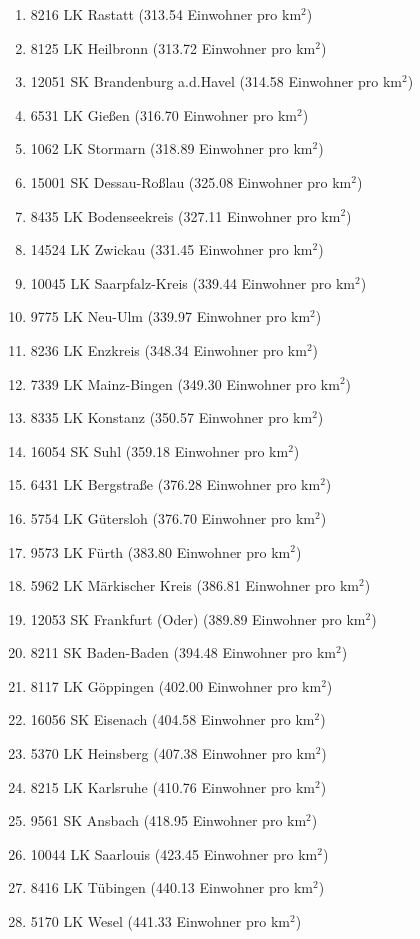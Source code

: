 \begin{enumerate}[itemsep=-6mm]
\item 8216 LK Rastatt (313.54 Einwohner pro km$^2$)
\item 8125 LK Heilbronn (313.72 Einwohner pro km$^2$)
\item 12051 SK Brandenburg a.d.Havel (314.58 Einwohner pro km$^2$)
\item 6531 LK Gießen (316.70 Einwohner pro km$^2$)
\item 1062 LK Stormarn (318.89 Einwohner pro km$^2$)
\item 15001 SK Dessau-Roßlau (325.08 Einwohner pro km$^2$)
\item 8435 LK Bodenseekreis (327.11 Einwohner pro km$^2$)
\item 14524 LK Zwickau (331.45 Einwohner pro km$^2$)
\item 10045 LK Saarpfalz-Kreis (339.44 Einwohner pro km$^2$)
\item 9775 LK Neu-Ulm (339.97 Einwohner pro km$^2$)
\item 8236 LK Enzkreis (348.34 Einwohner pro km$^2$)
\item 7339 LK Mainz-Bingen (349.30 Einwohner pro km$^2$)
\item 8335 LK Konstanz (350.57 Einwohner pro km$^2$)
\item 16054 SK Suhl (359.18 Einwohner pro km$^2$)
\item 6431 LK Bergstraße (376.28 Einwohner pro km$^2$)
\item 5754 LK Gütersloh (376.70 Einwohner pro km$^2$)
\item 9573 LK Fürth (383.80 Einwohner pro km$^2$)
\item 5962 LK Märkischer Kreis (386.81 Einwohner pro km$^2$)
\item 12053 SK Frankfurt (Oder) (389.89 Einwohner pro km$^2$)
\item 8211 SK Baden-Baden (394.48 Einwohner pro km$^2$)
\item 8117 LK Göppingen (402.00 Einwohner pro km$^2$)
\item 16056 SK Eisenach (404.58 Einwohner pro km$^2$)
\item 5370 LK Heinsberg (407.38 Einwohner pro km$^2$)
\item 8215 LK Karlsruhe (410.76 Einwohner pro km$^2$)
\item 9561 SK Ansbach (418.95 Einwohner pro km$^2$)
\item 10044 LK Saarlouis (423.45 Einwohner pro km$^2$)
\item 8416 LK Tübingen (440.13 Einwohner pro km$^2$)
\item 5170 LK Wesel (441.33 Einwohner pro km$^2$)

\end{enumerate}

